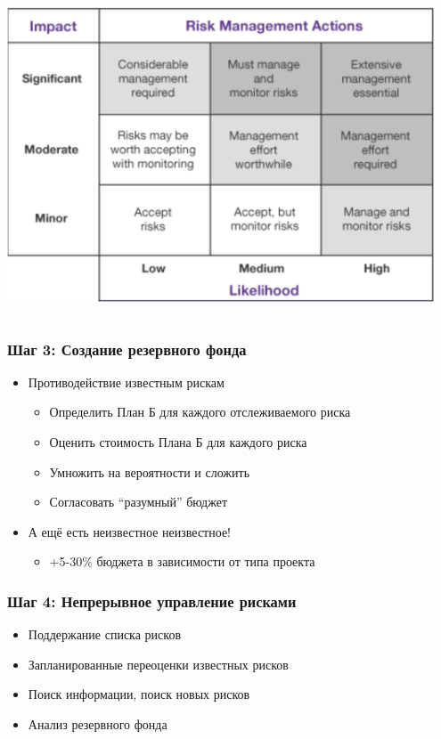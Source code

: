 \documentclass{../../slides-style}
\begin{document}
\begin{frame}
\begin{columns}
\begin{column}{0.4\textwidth}
\begin{center}
                    \includegraphics[width=0.95\textwidth]{riskMatrix.png}
                \end{center}
            \end{column}
        \end{columns}
    \end{frame}

    \begin{frame}
        \frametitle{Шаг 3: Создание резервного фонда}
        \begin{itemize}
            \item Противодействие известным рискам
            \begin{itemize}
                \item Определить План Б для каждого отслеживаемого риска
                \item Оценить стоимость Плана Б для каждого риска
                \item Умножить на вероятности и сложить
                \item Согласовать \enquote{разумный} бюджет
            \end{itemize}
            \item А ещё есть неизвестное неизвестное!
            \begin{itemize}
                \item +5-30\% бюджета в зависимости от типа проекта
            \end{itemize}
        \end{itemize}
    \end{frame}

    \begin{frame}
        \frametitle{Шаг 4: Непрерывное управление рисками}
        \begin{itemize}
            \item Поддержание списка рисков
            \item Запланированные переоценки известных рисков
            \item Поиск информации, поиск новых рисков
            \item Анализ резервного фонда
        \end{itemize}
    \end{frame}
\end{document}
